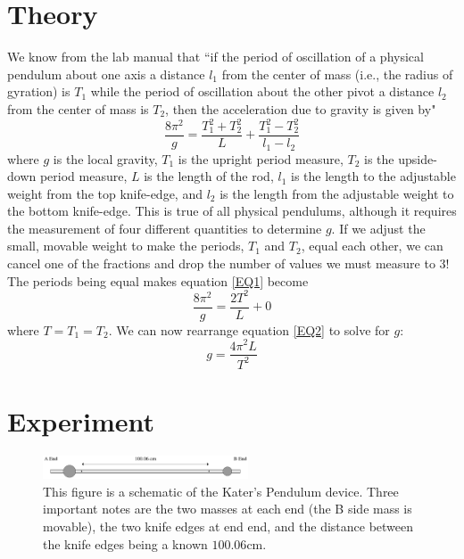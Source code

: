 \documentclass[aps,prl,10pt,twocolumn,floatfix]{revtex4-2}
\begin{document}
\section{Theory}\label{Theory}
We know from the lab manual that ``if the period of oscillation of a physical pendulum about one axis a distance $l_1$ from the center of mass (i.e., the radius of gyration) is $T_1$ while the period of oscillation about the other pivot a distance $l_2$ from the center of mass is $T_2$, then the acceleration due to gravity is given by\cite{Manual}"
\begin{equation}\label{EQ1}
\frac{8\pi^2}{g}=\frac{T_1^2+T_2^2}{L}+\frac{T_1^2-T_2^2}{l_1-l_2}
\end{equation}
where $g$ is the local gravity, $T_1$ is the upright period measure, $T_2$ is the upside-down period measure, $L$ is the length of the rod, $l_1$ is the length to the adjustable weight from the top knife-edge, and $l_2$ is the length from the adjustable weight to the bottom knife-edge. 
This is true of all physical pendulums, although it requires the measurement of four different quantities to determine $g$. 
If we adjust the small, movable weight to make the periods, $T_1$ and $T_2$, equal each other, we can cancel one of the fractions and drop the number of values we must measure to 3!
The periods being equal makes equation \ref{EQ1} become
\begin{equation}\label{EQ2}
\frac{8\pi^2}{g}=\frac{2T^2}{L}+0
\end{equation}
where $T=T_1=T_2$.
We can now rearrange equation \ref{EQ2} to solve for $g$:
\begin{equation}\label{finalE}
g=\frac{4\pi^2L}{T^2}
\end{equation}

\section{Experiment}
\begin{figure}
\includegraphics[width=230px]{diagram.eps}
\caption{This figure is a schematic of the Kater's Pendulum device. Three important notes are the two masses at each end (the B side mass is movable), the two knife edges at end end, and the distance between the knife edges being a known $100.06$cm.}
\label{pendulum}
\end{figure}
\end{document}
